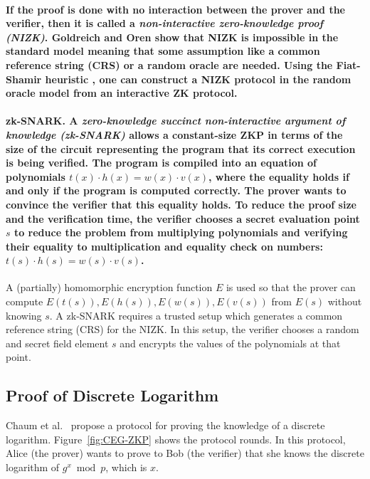 \documentclass[10pt]{article}
\theoremstyle{plain}
\begin{document}
\paragraph{\textmd{If the proof is done with no interaction between the prover
		and the verifier, then it is called a }\textmd{\emph{non-interactive
			zero-knowledge proof (NIZK)}}\textmd{. Goldreich and Oren \cite{goldreich1994}
		show that NIZK is impossible in the standard model meaning that some
		assumption like a common reference string (CRS) or a random oracle
		are needed. Using the Fiat-Shamir heuristic \cite{fiat1986prove}, one
		can construct a NIZK protocol in the random oracle model from an interactive
		ZK protocol. }}

\paragraph{zk-SNARK.\textmd{ A }\textmd{\emph{zero-knowledge succinct non-interactive
			argument of knowledge (zk-SNARK)}}\textmd{ allows a constant-size
		ZKP in terms of the size of the circuit representing the program that
		its correct execution is being verified. The program is compiled into
		an equation of polynomials $t(x)\cdot h(x)=w(x)\cdot v(x)$, where
		the equality holds if and only if the program is computed correctly.
		The prover wants to convince the verifier that this equality holds.
		To reduce the proof size and the verification time, the verifier chooses
		a secret evaluation point $s$ to reduce the problem from multiplying
		polynomials and verifying their equality to multiplication and equality
		check on numbers: $t(s)\cdot h(s)=w(s)\cdot v(s)$.}}

A (partially) homomorphic encryption function $E$ is used so that
the prover can compute $E(t(s)),E(h(s)),E(w(s)),E(v(s))$ from $E(s)$
without knowing $s$. A zk-SNARK requires a trusted setup which generates
a common reference string (CRS) for the NIZK. In this setup, the verifier
chooses a random and secret field element $s$ and encrypts the values
of the polynomials at that point.

\subsection{Proof of Discrete Logarithm}

Chaum et al.\ \cite{Chaum:87:ZKP} propose a protocol for proving
the knowledge of a discrete logarithm. Figure~\ref{fig:CEG-ZKP}
shows the protocol rounds. In this protocol, Alice (the prover) wants
to prove to Bob (the verifier) that she knows the discrete logarithm
of $g^{x}\bmod p$, which is $x$.
\end{document}
